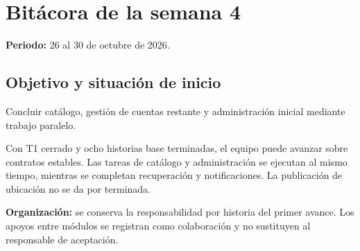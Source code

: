 \section{Bitácora de la semana 4}
\textbf{Periodo:} 26 al 30 de octubre de 2026.

\notaBorrador

\subsection{Objetivo y situación de inicio}
Concluir catálogo, gestión de cuentas restante y administración inicial mediante trabajo paralelo.

Con T1 cerrado y ocho historias base terminadas, el equipo puede avanzar sobre contratos estables. Las tareas de catálogo y administración se ejecutan al mismo tiempo, mientras se completan recuperación y notificaciones. La publicación de ubicación no se da por terminada.

\textbf{Organización:} se conserva la responsabilidad por historia del primer avance. Los apoyos entre módulos se registran como colaboración y no sustituyen al responsable de aceptación.

